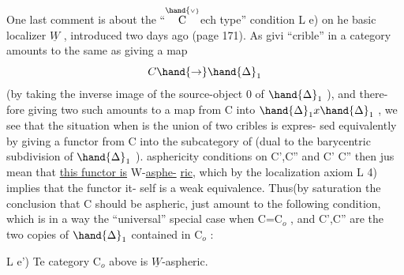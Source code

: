 One last comment is about the ``$\overset{\hand{\scriptscriptstyle\vee}}{\mathrm C}$ech type'' condition L e) on he
basic localizer $\underline{W}$ , introduced  two days ago (page 171). As 
givi   ``crible'' in a category amounts to the same as giving a map
\[ C \hand{\to} \hand{\Delta}_1 \]
(by taking the inverse image of the source-object \hand{\{}0\hand{\}} of $\hand{\Delta}_1$ ), and there-%
fore giving two such amounts to a map from C into $\hand{\Delta}_1 x \hand{\Delta}_1$ , we see that
the  situation when  is the union of two cribles is  expres-%
sed  equivalently by giving a functor from C into the subcategory
\diagram{\[ C_o = \hand{\Biggl(} \begin{tikzcd}[row sep=small] \& b \\ a \arrow[ur,color=blue] \arrow[dr,color=blue] \& \\ \& c \end{tikzcd} \hand{\Biggr)} \]}
of  (dual to the barycentric subdivision of $\hand{\Delta}_1$ ).  asphericity
conditions on C',C'' and C' C'' then jus mean that \uline{this functor is} W-\uline{asphe-}%
\uline{ric}, which by the localization axiom L 4) implies that the functor it-%
self is a weak equivalence. Thus(by saturation the conclusion that C
should be aspheric, just amount to the following condition, which is
in a way the ``universal'' special case when C=C$_o$ , and C',C'' are the
two copies of $\hand{\Delta}_1$ contained in C$_o$ :

L e') Te category C$_o$ above is $\underline{W}$-aspheric.

